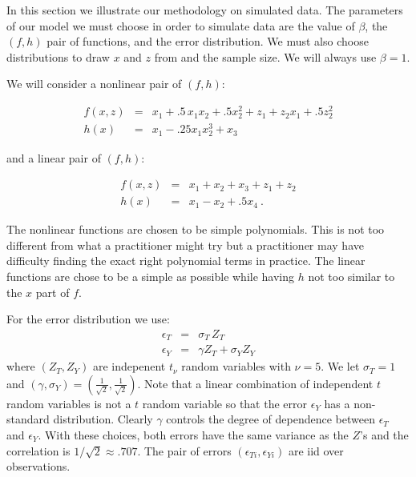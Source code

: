 
In this section we illustrate our methodology on simulated data.
The parameters of our model we must choose in order to simulate data are the value of $\beta$,
the $(f,h)$ pair of functions, and the error distribution.
We must also choose distributions to draw $x$ and $z$ from and the sample size.
We will always use $\beta=1$.



We will consider a nonlinear pair of $(f,h)$:

\begin{eqnarray}\label{eq:sim-nonlinfuns}
f(x,z) & = & x_1 + .5 \, x_1 x_2 + .5 x_2^2 + z_1 + z_2 x_1 + .5 z_2^2  \label{eq:sim-nonlinfuns-f} \\
h(x) & = & x_1 - .25 x_1 x_2^3 + x_3 \label{eq:sim-nonlinfuns-h}
\end{eqnarray}

and a linear pair of $(f,h)$:

\begin{eqnarray}\label{eq:sim-linfuns}
f(x,z) & = & x_1 + x_2 + x_3 + z_1 + z_2 \label{eq:sim-linfuns-f}\\
h(x) & = & x_1 - x_2 + .5 x_4\ . \label{eq:sim-linfuns-h}
\end{eqnarray}

The nonlinear functions are chosen to be simple polynomials.
This is not too different from what a practitioner might try but 
a practitioner may have difficulty finding the exact right polynomial terms in practice.
The linear functions are chose to be a simple as possible while having $h$ not too similar to the $x$ part of $f$.

For the error distribution we use:
\begin{eqnarray}\label{eq:sim-error}
\epsilon_T & = & \sigma_T \, Z_T \\
\epsilon_Y & = & \gamma Z_T + \sigma_Y Z_Y
\end{eqnarray}
where $(Z_T,Z_Y)$ are indepenent $t_\nu$ random variables with $\nu=5$.
We let $\sigma_T = 1$ and $(\gamma,\sigma_Y) = (\frac{1}{\sqrt{2}},\frac{1}{\sqrt{2}})$. 
Note that a linear combination of independent $t$ random variables is not a $t$ random variable so that the error $\epsilon_Y$ has
a non-standard distribution.
Clearly $\gamma$ controls the degree of dependence between $\epsilon_T$ and $\epsilon_Y$.
With these choices, both errors have the same variance as the $Z$'s and the correlation is $1/\sqrt{2} \approx .707$.
The pair of errors $(\epsilon_{Ti},\epsilon_{Yi})$ are iid over observations.

